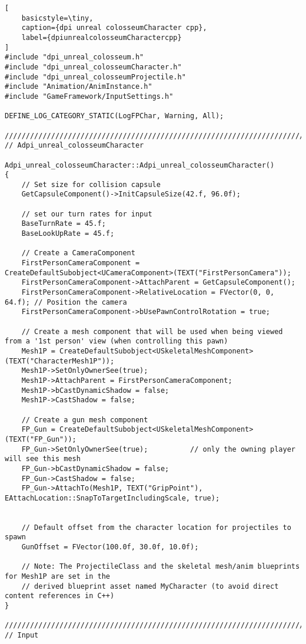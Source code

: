 \begin{lstlisting}[
	basicstyle=\tiny, 
	caption={dpi unreal colosseumCharacter cpp}, 
	label={dpiunrealcolosseumCharactercpp}
]
#include "dpi_unreal_colosseum.h"
#include "dpi_unreal_colosseumCharacter.h"
#include "dpi_unreal_colosseumProjectile.h"
#include "Animation/AnimInstance.h"
#include "GameFramework/InputSettings.h"

DEFINE_LOG_CATEGORY_STATIC(LogFPChar, Warning, All);

//////////////////////////////////////////////////////////////////////////
// Adpi_unreal_colosseumCharacter

Adpi_unreal_colosseumCharacter::Adpi_unreal_colosseumCharacter()
{
	// Set size for collision capsule
	GetCapsuleComponent()->InitCapsuleSize(42.f, 96.0f);

	// set our turn rates for input
	BaseTurnRate = 45.f;
	BaseLookUpRate = 45.f;

	// Create a CameraComponent	
	FirstPersonCameraComponent = CreateDefaultSubobject<UCameraComponent>(TEXT("FirstPersonCamera"));
	FirstPersonCameraComponent->AttachParent = GetCapsuleComponent();
	FirstPersonCameraComponent->RelativeLocation = FVector(0, 0, 64.f); // Position the camera
	FirstPersonCameraComponent->bUsePawnControlRotation = true;

	// Create a mesh component that will be used when being viewed from a '1st person' view (when controlling this pawn)
	Mesh1P = CreateDefaultSubobject<USkeletalMeshComponent>(TEXT("CharacterMesh1P"));
	Mesh1P->SetOnlyOwnerSee(true);
	Mesh1P->AttachParent = FirstPersonCameraComponent;
	Mesh1P->bCastDynamicShadow = false;
	Mesh1P->CastShadow = false;

	// Create a gun mesh component
	FP_Gun = CreateDefaultSubobject<USkeletalMeshComponent>(TEXT("FP_Gun"));
	FP_Gun->SetOnlyOwnerSee(true);			// only the owning player will see this mesh
	FP_Gun->bCastDynamicShadow = false;
	FP_Gun->CastShadow = false;
	FP_Gun->AttachTo(Mesh1P, TEXT("GripPoint"), EAttachLocation::SnapToTargetIncludingScale, true);


	// Default offset from the character location for projectiles to spawn
	GunOffset = FVector(100.0f, 30.0f, 10.0f);

	// Note: The ProjectileClass and the skeletal mesh/anim blueprints for Mesh1P are set in the
	// derived blueprint asset named MyCharacter (to avoid direct content references in C++)
}

//////////////////////////////////////////////////////////////////////////
// Input


\end{lstlisting}
